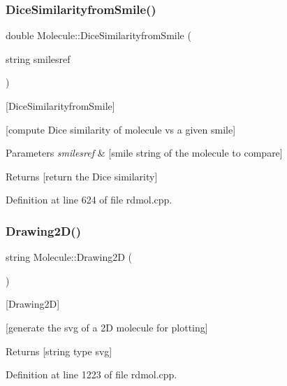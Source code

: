 \subsubsection{\texorpdfstring{Dice\+Similarityfrom\+Smile()}{DiceSimilarityfromSmile()}}
{\footnotesize\ttfamily double Molecule\+::\+Dice\+Similarityfrom\+Smile (\begin{DoxyParamCaption}\item[{string}]{smilesref }\end{DoxyParamCaption})}



\mbox{[}Dice\+Similarityfrom\+Smile\mbox{]} 

\mbox{[}compute Dice similarity of molecule vs a given smile\mbox{]}


\begin{DoxyParams}{Parameters}
{\em smilesref} & \mbox{[}smile string of the molecule to compare\mbox{]} \\
\hline
\end{DoxyParams}
\begin{DoxyReturn}{Returns}
\mbox{[}return the Dice similarity\mbox{]} 
\end{DoxyReturn}


Definition at line 624 of file rdmol.\+cpp.

\mbox{\label{class_molecule_a7048877e6bd7ac8c34f760ce9e92dc31}} 
\subsubsection{\texorpdfstring{Drawing2\+D()}{Drawing2D()}}
{\footnotesize\ttfamily string Molecule\+::\+Drawing2D (\begin{DoxyParamCaption}{ }\end{DoxyParamCaption})}



\mbox{[}Drawing2D\mbox{]} 

\mbox{[}generate the svg of a 2D molecule for plotting\mbox{]}

\begin{DoxyReturn}{Returns}
\mbox{[}string type svg\mbox{]} 
\end{DoxyReturn}


Definition at line 1223 of file rdmol.\+cpp.

\mbox{\label{class_molecule_ab5b0afe25fe921c55a3a9ccd3de78b08}} 
